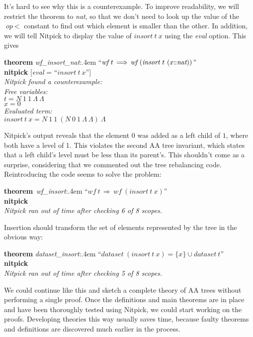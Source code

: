 \documentclass[a4paper,12pt]{article}
\def\Colon{\mathord{:\mkern-1.5mu:}}
\begin{document}
It's hard to see why this is a counterexample. To improve readability, we will
restrict the theorem to \textit{nat}, so that we don't need to look up the value
of the $\textit{op}~{<}$ constant to find out which element is smaller than the
other. In addition, we will tell Nitpick to display the value of
$\textit{insort}~t~x$ using the \textit{eval} option. This gives

\prew
\textbf{theorem} \textit{wf\_insort\_nat}:\kern.4em ``$\textit{wf}~t\,\Longrightarrow\, \textit{wf}~(\textit{insort}~t~(x\Colon\textit{nat}))$'' \\
\textbf{nitpick} [\textit{eval} = ``$\textit{insort}~t~x$''] \\[2\smallskipamount]
\slshape Nitpick found a counterexample: \\[2\smallskipamount]
\hbox{}\qquad Free variables: \nopagebreak \\
\hbox{}\qquad\qquad $t = N~1~1~\Lambda~\Lambda$ \\
\hbox{}\qquad\qquad $x = 0$ \\
\hbox{}\qquad Evaluated term: \\
\hbox{}\qquad\qquad $\textit{insort}~t~x = N~1~1~(N~0~1~\Lambda~\Lambda)~\Lambda$
\postw

Nitpick's output reveals that the element $0$ was added as a left child of $1$,
where both have a level of 1. This violates the second AA tree invariant, which
states that a left child's level must be less than its parent's. This shouldn't
come as a surprise, considering that we commented out the tree rebalancing code.
Reintroducing the code seems to solve the problem:

\prew
\textbf{theorem}~\textit{wf\_insort}:\kern.4em ``$\textit{wf}~t\,\Longrightarrow\, \textit{wf}~(\textit{insort}~t~x)$'' \\
\textbf{nitpick} \\[2\smallskipamount]
{\slshape Nitpick ran out of time after checking 6 of 8 scopes.}
\postw

Insertion should transform the set of elements represented by the tree in the
obvious way:

\prew
\textbf{theorem} \textit{dataset\_insort}:\kern.4em
``$\textit{dataset}~(\textit{insort}~t~x) = \{x\} \cup \textit{dataset}~t$'' \\
\textbf{nitpick} \\[2\smallskipamount]
{\slshape Nitpick ran out of time after checking 5 of 8 scopes.}
\postw

We could continue like this and sketch a complete theory of AA trees without
performing a single proof. Once the definitions and main theorems are in place
and have been thoroughly tested using Nitpick, we could start working on the
proofs. Developing theories this way usually saves time, because faulty theorems
and definitions are discovered much earlier in the process.
\end{document}

